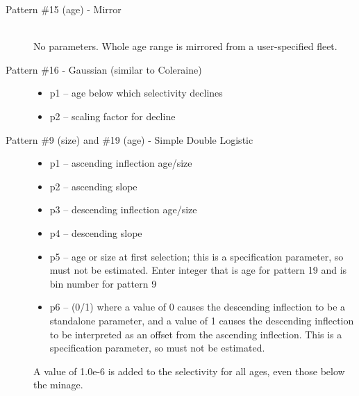 \begin{description}
	\item[Pattern \#15 (age) - Mirror]\hfil\\
	No parameters.  Whole age range is mirrored from a user-specified fleet.
\end{description}

\begin{description}
	\item[Pattern \#16 - Gaussian (similar to Coleraine)]\hfil
	\begin{itemize}
		\item p1 – age below which selectivity declines
		\item p2 – scaling factor for decline
	\end{itemize}
\end{description}

\begin{description}
	\item[Pattern \#9 (size) and \#19 (age) - Simple Double Logistic]\hfil
	\begin{itemize}
		\item p1 – ascending inflection age/size
		\item p2 – ascending slope
		\item p3 – descending inflection age/size
		\item p4 – descending slope
		\item p5 – age or size at first selection; this is a specification parameter, so must not be estimated.  Enter integer that is age for pattern 19 and is bin number for pattern 9
		\item p6 – (0/1)  where a value of 0 causes the descending inflection to be a standalone parameter, and a value of 1 causes the descending inflection to be interpreted as an offset from the ascending inflection.  This is a specification parameter, so must not be estimated.
	\end{itemize}
	A value of 1.0e-6 is added to the selectivity for all ages, even those below the minage.\\
\end{description}

